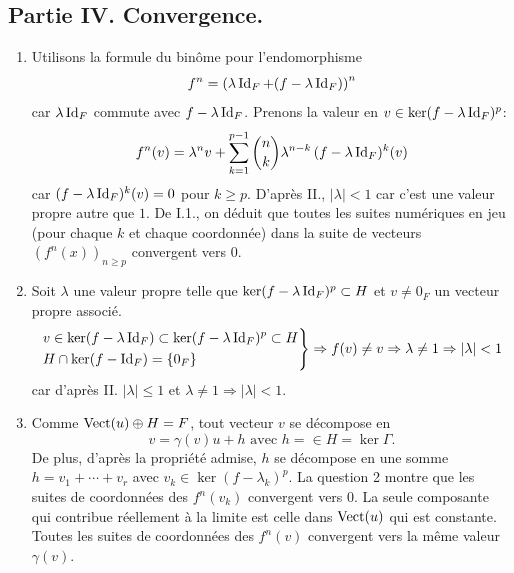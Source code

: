 \subsection*{Partie IV. Convergence.}
\begin{enumerate}
 \item  Utilisons la formule du binôme pour l'endomorphisme 
\[
  f^n = \left(\lambda \operatorname{Id}_F + (f -\lambda \operatorname{Id}_F) \right)^n
\]
car $\lambda \operatorname{Id}_F$ commute avec $f -\lambda \operatorname{Id}_F$. Prenons la valeur en $v \in \ker(f- \lambda \operatorname{Id}_F)^p$:
\[
f^n(v) = \lambda ^n v + \sum_{k=1}^{p-1}\binom{n}{k}\lambda^{n-k}\,(f-\lambda\operatorname{Id}_F)^k(v)  
\]
car $(f-\lambda\operatorname{Id}_F)^k(v)=0$ pour $k\geq p$. D'après II., $|\lambda|<1$ car c'est une valeur propre autre que $1$. De I.1., on déduit que toutes les suites numériques en jeu (pour chaque $k$ et chaque coordonnée) dans la suite de vecteurs $(f^n(x))_{n \geq p}$ convergent vers $0$.
 
 \item Soit $\lambda$ une valeur propre telle que $\ker(f - \lambda \operatorname{Id}_F)^p \subset H$ et $v\neq 0_F$ un vecteur propre associé. 
\[
\left.
\begin{aligned}
  &v \in \ker(f - \lambda \operatorname{Id}_F) \subset \ker(f - \lambda \operatorname{Id}_F)^p \subset H \\
  &H \cap \ker(f - \operatorname{Id}_F) = \left\lbrace 0_F\right\rbrace
\end{aligned}
\right\rbrace \Rightarrow
 f(v) \neq v \Rightarrow \lambda \neq 1 \Rightarrow |\lambda| < 1  
\]
car d'après II. $|\lambda|\leq 1$ et $\lambda \neq 1 \Rightarrow |\lambda| < 1$.

 \item Comme $\operatorname{Vect}(u) \oplus H = F$, tout vecteur $v$ se décompose en
\begin{displaymath}
 v = \gamma(v) u + h \text{ avec } h = \in H = \ker \Gamma.
\end{displaymath}
De plus, d'après la propriété admise, $h$ se décompose en une somme $h = v_1 + \cdots + v_r$ avec $v_k \in \ker(f-\lambda_k)^p$. La question 2 montre que les suites de coordonnées des $f^n(v_k)$ convergent vers $0$. La seule composante qui contribue réellement à la limite est celle dans $\operatorname{Vect}(u)$ qui est constante. Toutes les suites de coordonnées des $f^n(v)$ convergent vers la même valeur $\gamma(v)$.
\end{enumerate}
